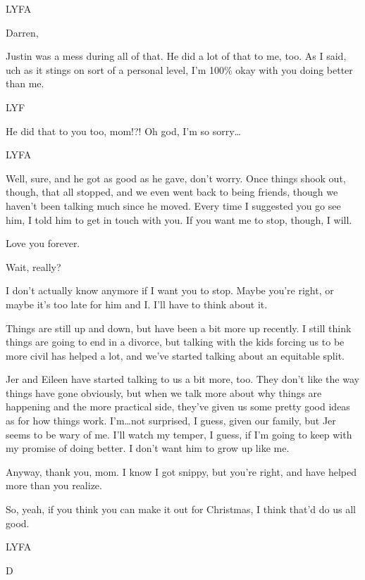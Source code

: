 LYFA

\secdiv{}\newpage

Darren,

Justin was a mess during all of that. He did a lot of that to me, too. As I said, uch as it stings on sort of a personal level, I'm 100\% okay with you doing better than me.

LYF

\secdiv{}

He did that to you too, mom!?! Oh god, I'm so sorry\ldots{}

LYFA

\secdiv{}

Well, sure, and he got as good as he gave, don't worry. Once things shook out, though, that all stopped, and we even went back to being friends, though we haven't been talking much since he moved. Every time I suggested you go see him, I told him to get in touch with you. If you want me to stop, though, I will.

Love you forever.

\secdiv{}

Wait, really?

I don't actually know anymore if I want you to stop. Maybe you're right, or maybe it's too late for him and I. I'll have to think about it.

Things are still up and down, but have been a bit more up recently. I still think things are going to end in a divorce, but talking with the kids forcing us to be more civil has helped a lot, and we've started talking about an equitable split.\newpage

Jer and Eileen have started talking to us a bit more, too. They don't like the way things have gone obviously, but when we talk more about why things are happening and the more practical side, they've given us some pretty good ideas as for how things work. I'm\ldots{}not surprised, I guess, given our family, but Jer seems to be wary of me. I'll watch my temper, I guess, if I'm going to keep with my promise of doing better. I don't want him to grow up like me.

Anyway, thank you, mom. I know I got snippy, but you're right, and have helped more than you realize.

So, yeah, if you think you can make it out for Christmas, I think that'd do us all good.

LYFA

D

